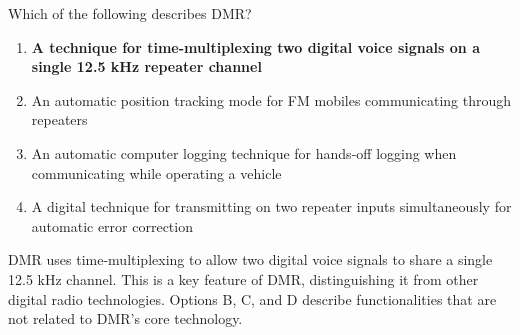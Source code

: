 \begin{tcolorbox}[colback=gray!10!white,colframe=black!75!black,title={T8D07}]
    Which of the following describes DMR?
    \begin{enumerate}[label=\Alph*),noitemsep]
        \item \textbf{A technique for time-multiplexing two digital voice signals on a single 12.5 kHz repeater channel}
        \item An automatic position tracking mode for FM mobiles communicating through repeaters
        \item An automatic computer logging technique for hands-off logging when communicating while operating a vehicle
        \item A digital technique for transmitting on two repeater inputs simultaneously for automatic error correction
    \end{enumerate}
\end{tcolorbox}

DMR uses time-multiplexing to allow two digital voice signals to share a single 12.5 kHz channel. This is a key feature of DMR, distinguishing it from other digital radio technologies. Options B, C, and D describe functionalities that are not related to DMR's core technology.
